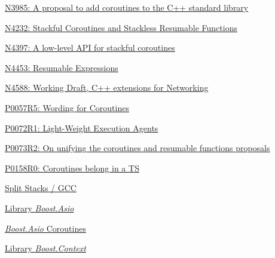 \begin{thebibliography}{99}

        \href{http://www.open-std.org/jtc1/sc22/wg21/docs/papers/2014/n3985.pdf}
        {N3985: A proposal to add coroutines to the C++ standard library}

        \href{http://www.open-std.org/jtc1/sc22/wg21/docs/papers/2014/n4232.pdf}
        {N4232: Stackful Coroutines and Stackless Resumable Functions}

        \href{http://www.open-std.org/jtc1/sc22/wg21/docs/papers/2015/n4397.pdf}
        {N4397: A low-level API for stackful coroutines}

        \href{http://www.open-std.org/jtc1/sc22/wg21/docs/papers/2015/n4453.pdf}
        {N4453: Resumable Expressions}

        \href{http://www.open-std.org/jtc1/sc22/wg21/docs/papers/2016/n4588.pdf}
        {N4588: Working Draft, C++ extensions for Networking}

        \href{http://www.open-std.org/jtc1/sc22/wg21/docs/papers/2016/p0057r5.pdf}
        {P0057R5: Wording for Coroutines}

        \href{http://www.open-std.org/jtc1/sc22/wg21/docs/papers/2016/p0072r1.pdf}
        {P0072R1: Light-Weight Execution Agents}

        \href{http://www.open-std.org/jtc1/sc22/wg21/docs/papers/2016/p0073r2.pdf}
        {P0073R2: On unifying the coroutines and resumable functions proposals}

        \href{http://www.open-std.org/jtc1/sc22/wg21/docs/papers/2015/p0158r0.html}
        {P0158R0: Coroutines belong in a TS}

        \href{http://gcc.gnu.org/wiki/SplitStacks}
        {Split Stacks / GCC}

        \href{http://www.boost.org/doc/libs/release/doc/html/boost\_asio.html}
        {Library \emph{Boost.Asio}}

        \href{http://www.boost.org/doc/libs/release/doc/html/boost_asio/reference/coroutine.html}
        {\emph{Boost.Asio} Coroutines}

        \href{http://www.boost.org/doc/libs/release/libs/context/doc/html/index.html}
        {Library \emph{Boost.Context}}


\end{thebibliography}
